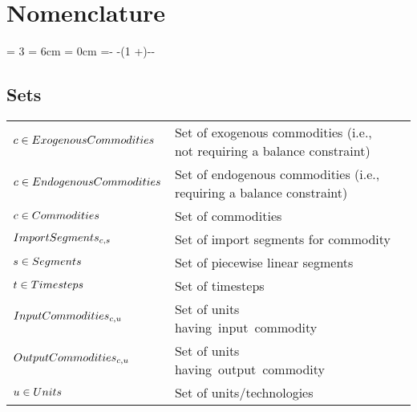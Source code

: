 \section*{Nomenclature}
\newcount\totalcol
\totalcol = 3
\newdimen\cola
\cola = 6cm
\newdimen\colb
\colb = 0cm
\newdimen\colc
\colc =\dimexpr\textwidth -\tabcolsep * -\arrayrulewidth * (1 +\totalcol)-\cola -\colb\relax
\subsection*{Sets}
\vspace{-1em}
	\begin{longtable}{p{\cola} p{\colc} >{\small\raggedleft\arraybackslash\itshape}p{\colb}}
		$c \in ExogenousCommodities$	& Set of exogenous commodities (i.e., not requiring a balance constraint)	&                \\
		$c \in EndogenousCommodities$	& Set of endogenous commodities (i.e., requiring a balance constraint)	&                \\
		$c \in Commodities   $	& Set of commodities                                          	&                \\
		$ImportSegments_{c,s}$	& Set of import segments \segment for commodity \commodity    	&                \\
		$s \in Segments      $	& Set of piecewise linear segments                            	&                \\
		$t \in Timesteps     $	& Set of timesteps                                            	&                \\
		$InputCommodities_{c,u}$	& Set of units \unit having input commodity  \commodity       	&                \\
		$OutputCommodities_{c,u}$	& Set of units \unit having output commodity \commodity       	&                \\
		$u \in Units         $	& Set of units/technologies                                   	&                \\
	\end{longtable}

